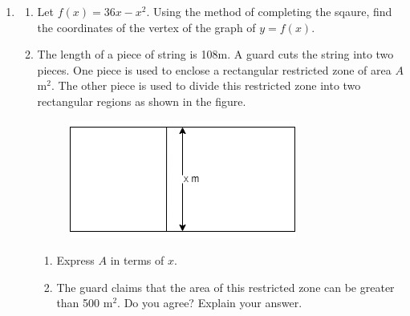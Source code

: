 \documentclass[11pt]{article}
\begin{document}
\begin{enumerate}
            \hrulefill
            
            \hrulefill

        \pagebreak
        \item \begin{enumerate}
            \item Let $f(x)=36x-x^2$. Using the method of completing the sqaure, find the coordinates of the vertex of the graph of $y=f(x)$.
            \item The length of a piece of string is 108m. A guard cuts the string into two pieces. One piece is used to enclose a rectangular restricted zone of area $A$ m$^2$. The other piece is used to divide this restricted zone into two rectangular regions as shown in the figure.\begin{figure}[H]
                \centering
                \includegraphics[scale=0.4]{f4finalq3.png}
            \end{figure}\begin{enumerate}
                \item Express $A$ in terms of $x$.
                \item The guard claims that the area of this restricted zone can be greater than 500 m$^{2}$. Do you agree? Explain your answer.
            \end{enumerate}
        \end{enumerate}
        
            \hrulefill
                
            \hrulefill

            \hrulefill
            
            \hrulefill
        
            \hrulefill
            
            \hrulefill
                
            \hrulefill
            
            \hrulefill
                
            \hrulefill
            
            \hrulefill
            

\end{enumerate}
\end{document}
